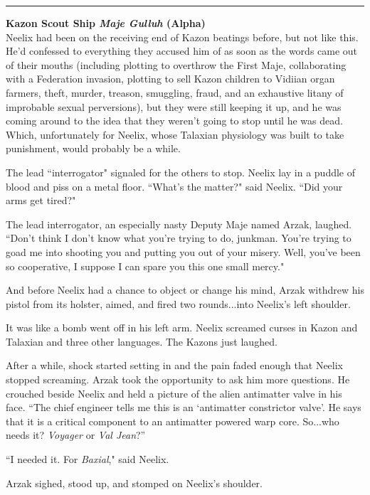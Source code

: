 \documentclass[twoside,letterpaper,12pt]{memoir}
\begin{document}
\begin{center}\rule{3cm}{0.4 pt}\end{center}

\noindent\textbf{Kazon Scout Ship \textit{Maje Gulluh} (Alpha)}\\

Neelix had been on the receiving end of Kazon beatings before, but not like this. He'd confessed to everything they accused him of as soon as the words came out of their mouths (including plotting to overthrow the First Maje, collaborating with a Federation invasion, plotting to sell Kazon children to Vidiian organ farmers, theft, murder, treason, smuggling, fraud, and an exhaustive litany of improbable sexual perversions), but they were still keeping it up, and he was coming around to the idea that they weren't going to stop until he was dead. Which, unfortunately for Neelix, whose Talaxian physiology was built to take punishment, would probably be a while.

The lead ``interrogator" signaled for the others to stop. Neelix lay in a puddle of blood and piss on a metal floor. ``What's the matter?" said Neelix. ``Did your arms get tired?"

The lead interrogator, an especially nasty Deputy Maje named Arzak, laughed. ``Don't think I don't know what you're trying to do, junkman. You're trying to goad me into shooting you and putting you out of your misery. Well, you've been so cooperative, I suppose I can spare you this one small mercy."

And before Neelix had a chance to object or change his mind, Arzak withdrew his pistol from its holster, aimed, and fired two rounds...into Neelix's left shoulder.

It was like a bomb went off in his left arm. Neelix screamed curses in Kazon and Talaxian and three other languages. The Kazons just laughed.

After a while, shock started setting in and the pain faded enough that Neelix stopped screaming. Arzak took the opportunity to ask him more questions. He crouched beside Neelix and held a picture of the alien antimatter valve in his face. ``The chief engineer tells me this is an ‘antimatter constrictor valve’. He says that it is a critical component to an antimatter powered warp core. So...who needs it? \textit{Voyager} or \textit{Val Jean}?”

``I needed it. For \textit{Baxial}," said Neelix.

Arzak sighed, stood up, and stomped on Neelix's shoulder.
\end{document}
